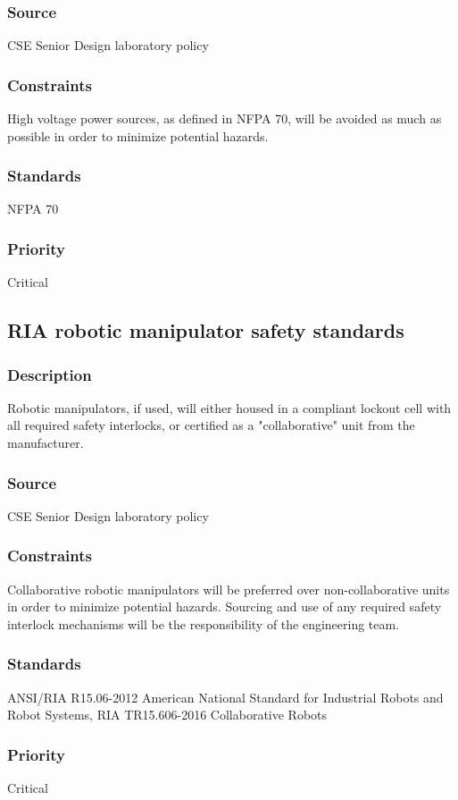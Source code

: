 \subsubsection{Source}
CSE Senior Design laboratory policy
\subsubsection{Constraints}
High voltage power sources, as defined in NFPA 70, will be avoided as much as possible in order to minimize potential hazards.
\subsubsection{Standards}
NFPA 70
\subsubsection{Priority}
Critical

\subsection{RIA robotic manipulator safety standards}
\subsubsection{Description}
Robotic manipulators, if used, will either housed in a compliant lockout cell with all required safety interlocks, or certified as a "collaborative" unit from the manufacturer.
\subsubsection{Source}
CSE Senior Design laboratory policy
\subsubsection{Constraints}
Collaborative robotic manipulators will be preferred over non-collaborative units in order to minimize potential hazards. Sourcing and use of any required safety interlock mechanisms will be the responsibility of the engineering team.
\subsubsection{Standards}
ANSI/RIA R15.06-2012 American National Standard for Industrial Robots and Robot Systems, RIA TR15.606-2016 Collaborative Robots
\subsubsection{Priority}
Critical
